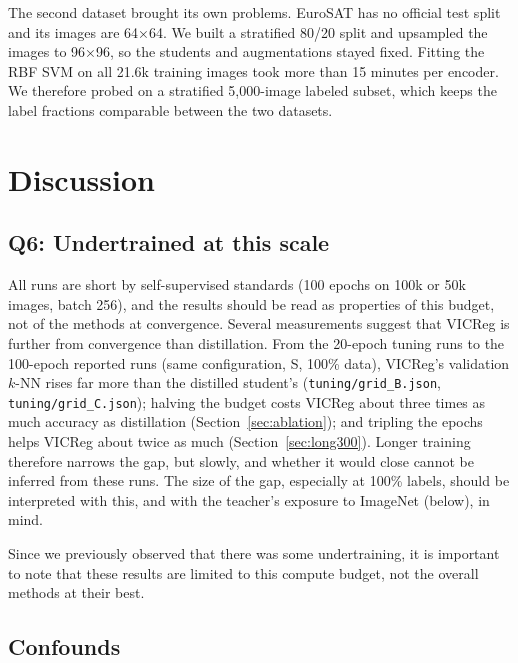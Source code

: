 \documentclass[letterpaper,11pt]{article}
\begin{document}
The second dataset brought its own problems. EuroSAT has no official test split and its images are 64×64. We built a stratified 80/20 split and upsampled the images to 96×96, so the students and augmentations stayed fixed. Fitting the RBF SVM on all 21.6k training images took more than 15 minutes per encoder. We therefore probed on a stratified 5,000-image labeled subset, which keeps the label fractions comparable between the two datasets.

\section{Discussion}
\label{sec:discussion}

\subsection{Q6: Undertrained at this scale}
\label{sec:q6}

All runs are short by self-supervised standards (100 epochs on 100k or 50k images, batch
256), and the results should be read as properties of this budget, not of the methods at
convergence. Several measurements suggest that VICReg is further from convergence than
distillation. From the 20-epoch tuning runs to the 100-epoch reported runs (same configuration,
S, 100\% data), VICReg's validation $k$-NN rises far more than the distilled student's
(\texttt{tuning/grid\_B.json}, \texttt{tuning/grid\_C.json}); halving the budget costs VICReg
about three times as much accuracy as distillation (Section~\ref{sec:ablation}); and tripling
the epochs helps VICReg about twice as much (Section~\ref{sec:long300}). Longer training
therefore narrows the gap, but slowly, and whether it would close cannot be inferred from these
runs. The size of the gap, especially
at 100\% labels, should be interpreted with this, and with the teacher's exposure to
ImageNet (below), in mind.

Since we previously observed that there was some undertraining, it is important to note that these results are limited to this compute budget, not the overall methods at their best. 

\subsection{Confounds}
\label{sec:confounds}
\end{document}
